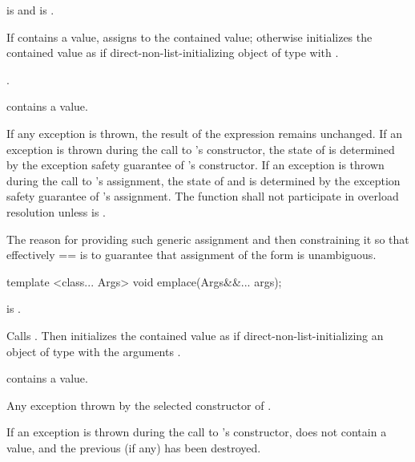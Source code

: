 \begin{itemdescr}
\pnum
\requires
{} is  and  is .

\pnum
\effects
If  contains a value, assigns  to the contained value; otherwise initializes the contained value as if direct-non-list-initializing object of type  with .

\pnum
\returns
{}.

\pnum
\postcondition
{} contains a value.

\pnum
\remarks
If any exception is thrown, the result of the expression  remains unchanged. If an exception is thrown during the call to 's constructor, the state of  is determined by the exception safety guarantee of 's constructor. If an exception is thrown during the call to 's assignment, the state of  and  is determined by the exception safety guarantee of 's assignment.
The function shall not participate in overload resolution unless
 is .

\pnum
\realnotes
The reason for providing such generic assignment and then constraining it so that effectively  ==  is to guarantee that assignment of the form  is unambiguous.
\end{itemdescr}

%
\begin{itemdecl}
template <class... Args> void emplace(Args&&... args);
\end{itemdecl}

\begin{itemdescr}
\pnum
\requires
{} is .

\pnum
\effects
Calls . Then initializes the contained value as if direct-non-list-initializing an object of type  with the arguments .

\pnum
\postcondition
{} contains a value.

\pnum
\throws
Any exception thrown by the selected constructor of .

\pnum
\remarks
If an exception is thrown during the call to 's constructor,  does not contain a value, and the previous  (if any) has been destroyed.
\end{itemdescr}


